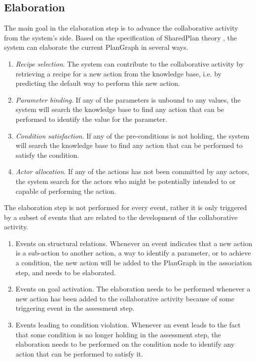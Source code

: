 \subsection{Elaboration} %
\label{sub:elaboration}
The main goal in the elaboration step is to advance the collaborative activity from the system's side. Based on the specification of SharedPlan theory \cite{Grosz2006}, the system can elaborate the current PlanGraph in several ways. 
\begin{enumerate}
	\item \emph{Recipe selection}. The system can contribute to the collaborative activity by retrieving a recipe for a new action from the knowledge base, i.e. by predicting the default way to perform this new action.
	\item \emph{Parameter binding}. If any of the parameters is unbound to any values, the system will search the knowledge base to find any action that can be performed to identify the value for the parameter.
	\item \emph{Condition satisfaction}. If any of the pre-conditions is not holding, the system will search the knowledge base to find any action that can be performed to satisfy the condition.
	\item \emph{Actor allocation}. If any of the actions has not been committed by any actors, the system search for the actors who might be potentially intended to or capable of performing the action. 
\end{enumerate}

The elaboration step is not performed for every event, rather it is only triggered by a subset of events that are related to the development of the collaborative activity. 
\begin{enumerate}
	\item Events on structural relations. Whenever an event indicates that a new action is a sub-action to another action, a way to identify a parameter, or to achieve a condition, the new action will be added to the PlanGraph in the association step, and needs to be elaborated.
	\item Events on goal activation. The elaboration needs to be performed whenever a new action has been added to the collaborative activity because of some triggering event in the assessment step.
	\item Events leading to condition violation. Whenever an event leads to the fact that some condition is no longer holding in the assessment step, the elaboration needs to be performed on the condition node to identify any action that can be performed to satisfy it.
\end{enumerate}

